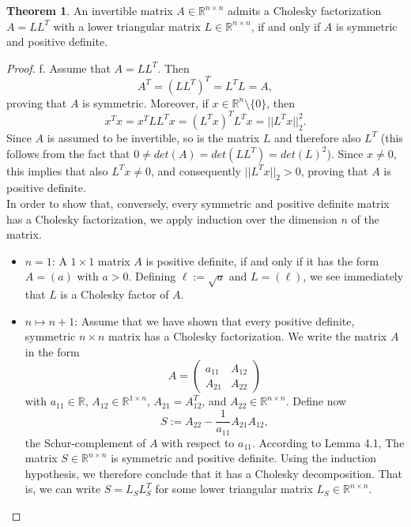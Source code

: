 \documentclass[11pt]{article}
\theoremstyle{definition}
\newtheorem{theorem}{Theorem}[section]
\begin{document}
\begin{theorem}
An invertible matrix $A\in\mathbb{R}^{n\times n}$ admits a Cholesky factorization $A=LL^T$ with a lower triangular matrix $L\in\mathbb{R}^{n\times n}$, if and only if $A$ is symmetric and positive definite.
\end{theorem}

\begin{proof}
f. Assume that $A=LL^T$. Then
\begin{equation*}
A^T=(LL^T)^T=L^TL=A,
\end{equation*}
proving that $A$ is symmetric. Moreover, if $x\in\mathbb{R}^n\setminus\{0\}$, then
\begin{equation*}
x^Tx=x^TLL^Tx=(L^Tx)^TL^Tx=||L^Tx||^2_2.
\end{equation*}
Since $A$ is assumed to be invertible, so is the matrix $L$ and therefore also $L^T$ (this follows from the fact that $0\neq det(A)=det(LL^T)=det(L)^2$). Since $x\neq 0$, this implies that also $L^Tx\neq 0$, and consequently $||L^Tx||_2>0$, proving that $A$ is positive definite. \\
In order to show that, conversely, every symmetric and positive definite matrix has a Cholesky factorization, we apply induction over the dimension $n$ of the matrix.
\begin{itemize}
\item $n=1$: A $1\times 1$ matrix $A$ is positive definite, if and only if it has the form $A=(a)$ with $a>0$. Defining $\ell:=\sqrt{a}$ and $L=(\ell)$, we see immediately that $L$ is a Cholesky factor of $A$.
\item $n\mapsto n+1$: Assume that we have shown that every positive definite, symmetric $n\times n$ matrix has a Cholesky factorization. We write the matrix $A$ in the form
\begin{equation*}
A=\begin{pmatrix}
a_{11} & A_{12} \\
A_{21} & A_{22}
\end{pmatrix}
\end{equation*}
with $a_{11}\in\mathbb{R}$, $A_{12}\in\mathbb{R}^{1\times n}$, $A_{21}=A_{12}^T$, and $A_{22}\in\mathbb{R}^{n\times n}$. Define now
\begin{equation*}
S:=A_{22}-\frac{1}{a_{11}}A_{21}A_{12},
\end{equation*}
the Schur-complement of $A$ with respect to $a_{11}$. According to Lemma 4.1, The matrix $S\in\mathbb{R}^{n\times n}$ is symmetric and positive definite. Using the induction hypothesis, we therefore conclude that it has a Cholesky decomposition. That is, we can write $S=L_SL_S^T$ for some lower triangular matrix $L_S\in\mathbb{R}^{n\times n}$. \\

\end{itemize}
\end{proof}
\end{document}
